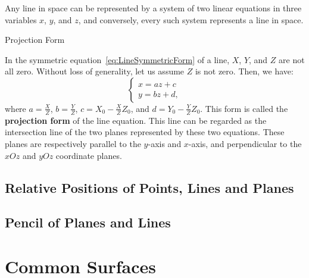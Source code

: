 \documentclass[11pt]{../../TexTemplate/elegantbook} %
\begin{document}
\begin{theorem}
    Any line in space can be represented by a system of two linear equations in three variables \(x\), \(y\), and \(z\),
    and conversely, every such system represents a line in space.
    
\end{theorem}

\begin{leftbarTitle}{Projection Form}\end{leftbarTitle}
In the symmetric equation~\ref{eq:LineSymmetricForm} of a line,
\(X\), \(Y\), and \(Z\) are not all zero. 
Without loss of generality, let us assume \(Z\) is not zero. 
Then, we have:
\[
\begin{cases}
    x = az + c \\
    y = bz + d,
\end{cases}
\]
where \(a = \frac{X}{Z}\), \(b = \frac{Y}{Z}\), \(c = X_{0} - \frac{X}{Z}Z_{0}\), and \(d = Y_{0} - \frac{Y}{Z}Z_{0}\).
This form is called the \textbf{projection form} of the line equation.
This line can be regarded as the intersection line of the two planes represented by these two equations. 
These planes are respectively parallel to the \(y\)-axis and \(x\)-axis, 
and perpendicular to the \(xOz\) and \(yOz\) coordinate planes.


\section{Relative Positions of Points, Lines and Planes}

\section{Pencil of Planes and Lines}

\chapter{Common Surfaces}
\end{document}
